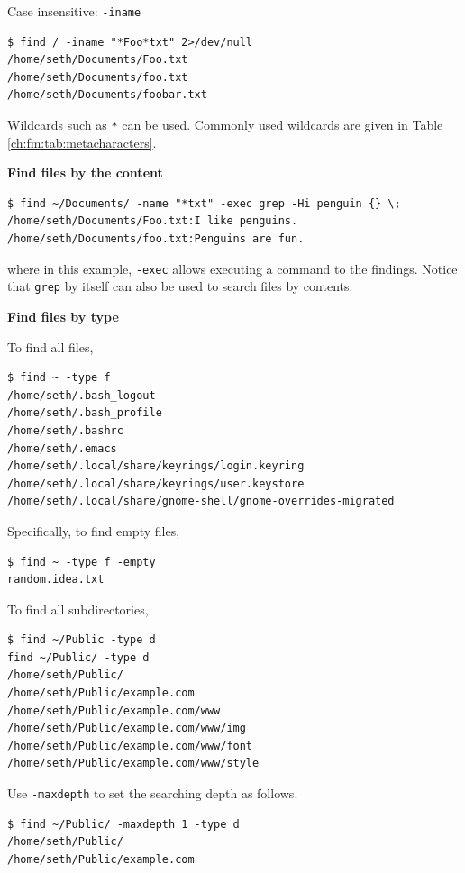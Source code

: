 Case insensitive: \verb|-iname|
\begin{lstlisting}
$ find / -iname "*Foo*txt" 2>/dev/null
/home/seth/Documents/Foo.txt
/home/seth/Documents/foo.txt
/home/seth/Documents/foobar.txt
\end{lstlisting}

Wildcards such as \verb|*| can be used. Commonly used wildcards are given in Table \ref{ch:fm:tab:metacharacters}.

\vspace{0.1in}
\noindent \textbf{Find files by the content}
\vspace{0.1in}

\begin{lstlisting}
$ find ~/Documents/ -name "*txt" -exec grep -Hi penguin {} \;
/home/seth/Documents/Foo.txt:I like penguins.
/home/seth/Documents/foo.txt:Penguins are fun.
\end{lstlisting}
where in this example, \verb|-exec| allows executing a command to the findings. Notice that \verb|grep| by itself can also be used to search files by contents.

\vspace{0.1in}
\noindent \textbf{Find files by type}
\vspace{0.1in}

To find all files,
\begin{lstlisting}
$ find ~ -type f
/home/seth/.bash_logout
/home/seth/.bash_profile
/home/seth/.bashrc
/home/seth/.emacs
/home/seth/.local/share/keyrings/login.keyring
/home/seth/.local/share/keyrings/user.keystore
/home/seth/.local/share/gnome-shell/gnome-overrides-migrated
\end{lstlisting}
Specifically, to find empty files,
\begin{lstlisting}
$ find ~ -type f -empty
random.idea.txt
\end{lstlisting}

To find all subdirectories,
\begin{lstlisting}
$ find ~/Public -type d
find ~/Public/ -type d
/home/seth/Public/
/home/seth/Public/example.com
/home/seth/Public/example.com/www
/home/seth/Public/example.com/www/img
/home/seth/Public/example.com/www/font
/home/seth/Public/example.com/www/style
\end{lstlisting}

Use \verb|-maxdepth| to set the searching depth as follows.
\begin{lstlisting}
$ find ~/Public/ -maxdepth 1 -type d
/home/seth/Public/
/home/seth/Public/example.com
\end{lstlisting}

